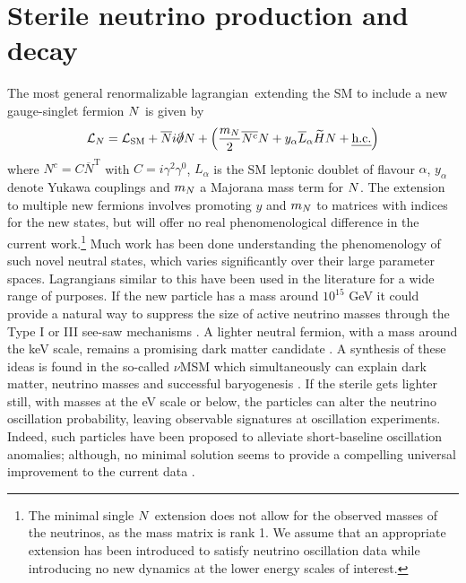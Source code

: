 \documentclass[11pt, a4paper]{article}
\def\lagrangian{lagrangian}
\def\ster{\ensuremath N}
\begin{document}
\section{\label{sec:decays}Sterile neutrino production and decay}

The most general renormalizable \lagrangian\ extending the SM to include a new gauge-singlet fermion $\ster$ is given by
%
\begin{align}   \mathcal{L}_N = \mathcal{L}_\text{SM} +
\overline{\ster}i\slashed{\partial}\ster + \left(\frac{m_\ster}{2}
\overline{\ster^\text{c}}\ster  + y_\alpha\overline{L}_\alpha\widetilde{H}
\ster + \text{\emph{h.c.}}\right)\label{eq:minimallag} \end{align}
%
where $N^c=C\overline{N}^\text{T}$ with $C=i\gamma^2\gamma^0$, $L_\alpha$ is
the SM leptonic doublet of flavour $\alpha$, $y_\alpha$ denote Yukawa couplings
and $m_\ster$ a Majorana mass term for $\ster$. The extension to multiple new
fermions involves promoting $y$ and $m_\ster$ to matrices with indices for the new
states, but will offer no real phenomenological difference in the current
work.\footnote{The minimal single $\ster$ extension does not allow for the
observed masses of the neutrinos, as the mass matrix is rank 1. We assume that
an appropriate extension has been introduced to satisfy neutrino oscillation
data while introducing no new dynamics at the lower energy scales of interest.}
Much work has been done understanding the phenomenology of such novel neutral
states, which varies significantly over their large parameter spaces. 
%
Lagrangians similar to this have been used in the literature for a wide range
of purposes. If the new particle has a mass around $10^{15}$ GeV it could
provide a natural way to suppress the size of active neutrino masses through
the Type I or III see-saw mechanisms \cite{Minkowski:1977sc, GellMann:1980vs,
Mohapatra:1979ia}. A lighter neutral fermion, with a mass around the keV scale,
remains a promising dark matter candidate \cite{Adhikari:2016bei}. A synthesis
of these ideas is found in the so-called $\nu$MSM which simultaneously can
explain dark matter, neutrino masses and successful baryogenesis
\cite{Asaka:2005pn}. 
%
If the sterile gets lighter still, with masses at the eV scale or below, the
particles can alter the neutrino oscillation probability, leaving observable
signatures at oscillation experiments. Indeed, such particles have been
proposed to alleviate short-baseline oscillation anomalies; although, no
minimal solution seems to provide a compelling universal improvement to the
current data \cite{Kopp:2013vaa,Conrad:2012qt}.
\end{document}
